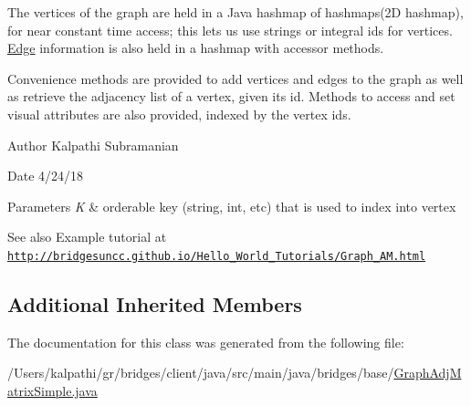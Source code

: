 The vertices of the graph are held in a Java hashmap of hashmaps(2\+D hashmap), for near constant time access; this lets us use strings or integral ids for vertices. \mbox{\hyperlink{classbridges_1_1base_1_1_edge}{Edge}} information is also held in a hashmap with accessor methods.

Convenience methods are provided to add vertices and edges to the graph as well as retrieve the adjacency list of a vertex, given its id. Methods to access and set visual attributes are also provided, indexed by the vertex ids.

\begin{DoxyAuthor}{Author}
Kalpathi Subramanian
\end{DoxyAuthor}
\begin{DoxyDate}{Date}
4/24/18
\end{DoxyDate}

\begin{DoxyParams}{Parameters}
{\em K} & orderable key (string, int, etc) that is used to index into vertex\\
\hline
\end{DoxyParams}
\begin{DoxySeeAlso}{See also}
Example tutorial at \href{http://bridgesuncc.github.io/Hello_World_Tutorials/Graph_AM.html}{\tt http\+://bridgesuncc.\+github.\+io/\+Hello\+\_\+\+World\+\_\+\+Tutorials/\+Graph\+\_\+\+A\+M.\+html} 
\end{DoxySeeAlso}
\subsection*{Additional Inherited Members}


The documentation for this class was generated from the following file\+:\begin{DoxyCompactItemize}
\item 
/\+Users/kalpathi/gr/bridges/client/java/src/main/java/bridges/base/\mbox{\hyperlink{_graph_adj_matrix_simple_8java}{Graph\+Adj\+Matrix\+Simple.\+java}}\end{DoxyCompactItemize}
